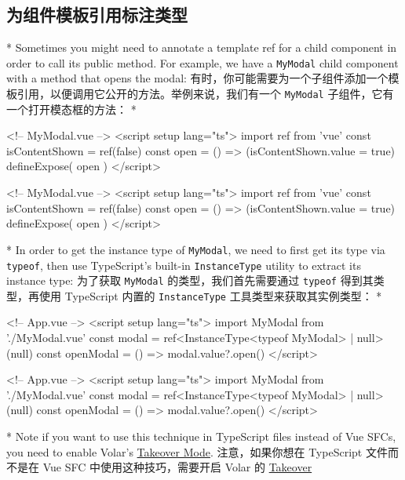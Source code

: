 \begin{paracol}{2}
\subsection{为组件模板引用标注类型}
\switchcolumn[0]*%
Sometimes you might need to annotate a template ref for a child
component in order to call its public method. For example, we have a
\texttt{MyModal} child component with a method that opens the modal:
\switchcolumn
有时，你可能需要为一个子组件添加一个模板引用，以便调用它公开的方法。举例来说，我们有一个
\texttt{MyModal} 子组件，它有一个打开模态框的方法：
\switchcolumn[0]*%
\begin{codeHtml}
<!-- MyModal.vue -->
<script setup lang="ts">
import { ref } from 'vue'
const isContentShown = ref(false)
const open = () => (isContentShown.value = true)
defineExpose({
  open
})
</script>
\end{codeHtml}
\switchcolumn
\begin{codeHtml}
<!-- MyModal.vue -->
<script setup lang="ts">
import { ref } from 'vue'
const isContentShown = ref(false)
const open = () => (isContentShown.value = true)
defineExpose({
  open
})
</script>
\end{codeHtml}
\switchcolumn[0]*%
In order to get the instance type of \texttt{MyModal}, we need to first
get its type via \texttt{typeof}, then use TypeScript's built-in
\texttt{InstanceType} utility to extract its instance type:
\switchcolumn
为了获取 \texttt{MyModal} 的类型，我们首先需要通过 \texttt{typeof}
得到其类型，再使用 TypeScript 内置的 \texttt{InstanceType}
工具类型来获取其实例类型：
\switchcolumn[0]*%
\begin{codeHtml}
<!-- App.vue -->
<script setup lang="ts">
import MyModal from './MyModal.vue'
const modal = ref<InstanceType<typeof MyModal> | null>(null)
const openModal = () => {
  modal.value?.open()
}
</script>
\end{codeHtml}
\switchcolumn
\begin{codeHtml}
<!-- App.vue -->
<script setup lang="ts">
import MyModal from './MyModal.vue'
const modal = ref<InstanceType<typeof MyModal> | null>(null)
const openModal = () => {
  modal.value?.open()
}
</script>
\end{codeHtml}
\switchcolumn[0]*%
Note if you want to use this technique in TypeScript files instead of
Vue SFCs, you need to enable Volar's
\href{https://vuejs.org/guide/typescript/overview.html\#volar-takeover-mode}{Takeover
Mode}.
\switchcolumn
注意，如果你想在 TypeScript 文件而不是在 Vue SFC
中使用这种技巧，需要开启 Volar 的
\href{https://cn.vuejs.org/guide/typescript/overview.html\#volar-takeover-mode}{Takeover
}
\end{paracol}
